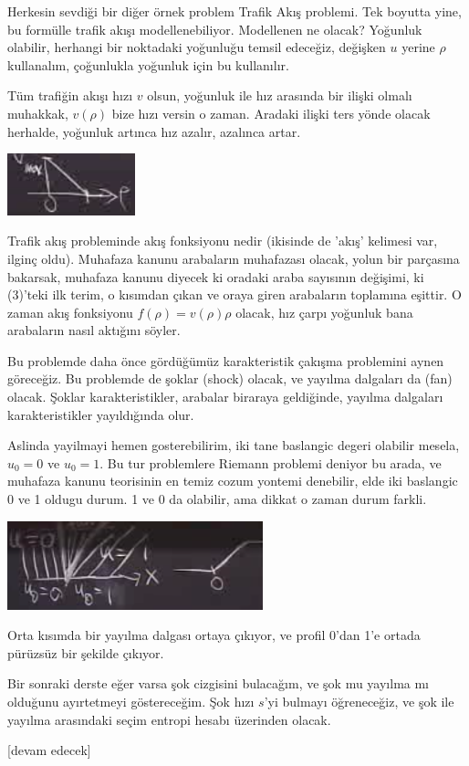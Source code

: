 \documentclass[12pt,fleqn]{article}\usepackage{../../common}
\begin{document}
Herkesin sevdiği bir diğer örnek problem Trafik Akış problemi. Tek boyutta yine,
bu formülle trafik akışı modellenebiliyor. Modellenen ne olacak? Yoğunluk
olabilir, herhangi bir noktadaki yoğunluğu temsil edeceğiz, değişken $u$ yerine
$\rho$ kullanalım, çoğunlukla yoğunluk için bu kullanılır.

Tüm trafiğin akışı hızı $v$ olsun, yoğunluk ile hız arasında bir ilişki olmalı
muhakkak, $v(\rho)$ bize hızı versin o zaman. Aradaki ilişki ters yönde olacak
herhalde, yoğunluk artınca hız azalır, azalınca artar. 

\includegraphics[width=10em]{compscieng_2_08_04.png}

Trafik akış probleminde akış fonksiyonu nedir (ikisinde de 'akış' kelimesi var,
ilginç oldu). Muhafaza kanunu arabaların muhafazası olacak, yolun bir parçasına
bakarsak, muhafaza kanunu diyecek ki oradaki araba sayısının değişimi, ki
(3)'teki ilk terim, o kısımdan çıkan ve oraya giren arabaların toplamına
eşittir. O zaman akış fonksiyonu $f(\rho) = v(\rho) \rho$ olacak, hız çarpı
yoğunluk bana arabaların nasıl aktığını söyler.

Bu problemde daha önce gördüğümüz karakteristik çakışma problemini aynen
göreceğiz. Bu problemde de şoklar (shock) olacak, ve yayılma dalgaları da (fan)
olacak. Şoklar karakteristikler, arabalar biraraya geldiğinde, yayılma dalgaları
karakteristikler yayıldığında olur.

Aslinda yayilmayi hemen gosterebilirim, iki tane baslangic degeri olabilir
mesela, $u_0 = 0$ ve $u_0 = 1$. Bu tur problemlere Riemann problemi deniyor
bu arada, ve muhafaza kanunu teorisinin en temiz cozum yontemi denebilir,
elde iki baslangic 0 ve 1 oldugu durum. 1 ve 0 da olabilir, ama dikkat
o zaman durum farkli.

\includegraphics[width=20em]{compscieng_2_08_05.png}

Orta kısımda bir yayılma dalgası ortaya çıkıyor, ve profil 0'dan 1'e ortada
pürüzsüz bir şekilde çıkıyor. 

Bir sonraki derste eğer varsa şok cizgisini bulacağım, ve şok mu yayılma mı
olduğunu ayırtetmeyi göstereceğim. Şok hızı $s$'yi bulmayı öğreneceğiz, ve şok
ile yayılma arasındaki seçim entropi hesabı üzerinden olacak.













[devam edecek]
  
\end{document}
